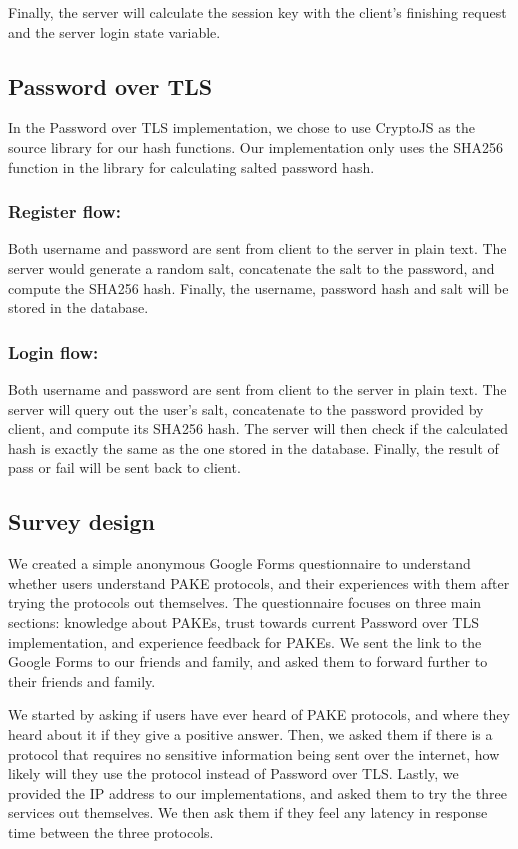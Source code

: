 Finally, the server will calculate the session key with the client's finishing request and the server login state variable.




\subsection{Password over TLS}
In the Password over TLS implementation, we chose to use CryptoJS as the source library for our hash functions.
Our implementation only uses the SHA256 function in the library for calculating salted password hash.

\subsubsection{Register flow:}
Both username and password are sent from client to the server in plain text.
The server would generate a random salt, concatenate the salt to the password, and compute the SHA256 hash.
Finally, the username, password hash and salt will be stored in the database.

\subsubsection{Login flow:}
Both username and password are sent from client to the server in plain text.
The server will query out the user's salt, concatenate to the password provided by client, and compute its SHA256 hash.
The server will then check if the calculated hash is exactly the same as the one stored in the database.
Finally, the result of pass or fail will be sent back to client.

\subsection{Survey design}

We created a simple anonymous Google Forms questionnaire to understand whether users understand PAKE protocols, and their experiences with them after trying the protocols out themselves.
The questionnaire focuses on three main sections: knowledge about PAKEs, trust towards current Password over TLS implementation, and experience feedback for PAKEs.
We sent the link to the Google Forms to our friends and family, and asked them to forward further to their friends and family.


We started by asking if users have ever heard of PAKE protocols, and where they heard about it if they give a positive answer.
Then, we asked them if there is a protocol that requires no sensitive information being sent over the internet, how likely will they use the protocol instead of Password over TLS.
Lastly, we provided the IP address to our implementations, and asked them to try the three services out themselves.
We then ask them if they feel any latency in response time between the three protocols.

